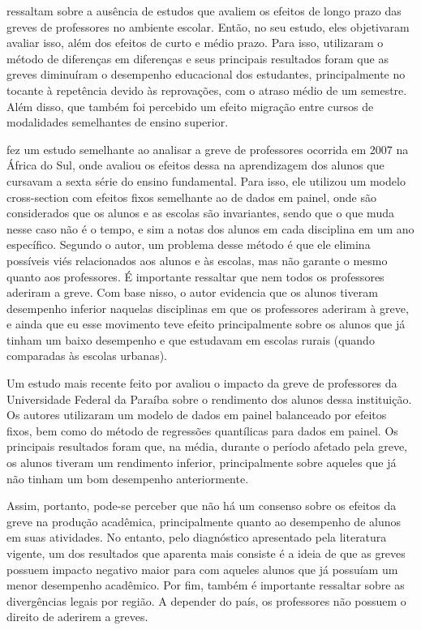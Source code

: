  ressaltam sobre a ausência de estudos que avaliem os efeitos de longo prazo das greves de professores no ambiente escolar. Então, no seu estudo, eles objetivaram avaliar isso, além dos efeitos de curto e médio prazo. Para isso, utilizaram o método de diferenças em diferenças e seus principais resultados foram que as greves diminuíram o desempenho educacional dos estudantes, principalmente no tocante à repetência devido às reprovações, com o atraso médio de um semestre. Além disso, que também foi percebido um efeito migração entre cursos de modalidades semelhantes de ensino superior.

 fez um estudo semelhante ao analisar a greve de professores ocorrida em 2007 na África do Sul, onde avaliou os efeitos dessa na aprendizagem dos alunos que cursavam a sexta série do ensino fundamental. Para isso, ele utilizou um modelo cross-section com efeitos fixos semelhante ao de dados em painel, onde são considerados que os alunos e as escolas são invariantes, sendo que o que muda nesse caso não é o tempo, e sim a notas dos alunos em cada disciplina em um ano específico. Segundo o autor, um problema desse método é que ele elimina possíveis viés relacionados aos alunos e às escolas, mas não garante o mesmo quanto aos professores. É importante ressaltar que nem todos os professores aderiram a greve. Com base nisso, o autor evidencia que os alunos tiveram desempenho inferior naquelas disciplinas em que os professores aderiram à greve, e ainda que eu esse movimento teve efeito principalmente sobre os alunos que já tinham um baixo desempenho e que estudavam em escolas rurais (quando comparadas às escolas urbanas).

Um estudo mais recente feito por  avaliou o impacto da greve de professores da Universidade Federal da Paraíba sobre o rendimento dos alunos dessa instituição. Os autores utilizaram um modelo de dados em painel balanceado por efeitos fixos, bem como do método de regressões quantílicas para dados em painel. Os principais resultados foram que, na média, durante o período afetado pela greve, os alunos tiveram um rendimento inferior, principalmente sobre aqueles que já não tinham um bom desempenho anteriormente.

Assim, portanto, pode-se perceber que não há um consenso sobre os efeitos da greve na produção acadêmica, principalmente quanto ao desempenho de alunos em suas atividades. No entanto, pelo diagnóstico apresentado pela literatura vigente, um dos resultados que aparenta mais consiste é a ideia de que as greves possuem impacto negativo maior para com aqueles alunos que já possuíam um menor desempenho acadêmico. Por fim, também é importante ressaltar sobre as divergências legais por região. A depender do país, os professores não possuem o direito de aderirem a greves.

